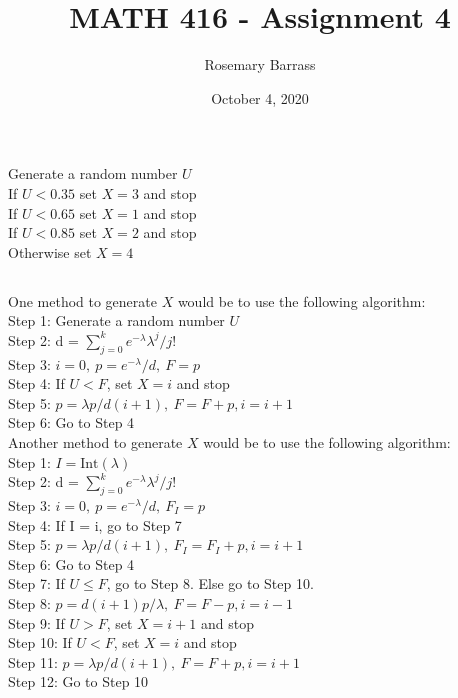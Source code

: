\documentclass{article}
\title{MATH 416 - Assignment 4}
\author{Rosemary Barrass }
\date{October 4, 2020}
\begin{document}
\setcounter{section}{4}
\setcounter{subsection}{2}
\subsection{}
Generate a random number $U$ \\
If $U < 0.35$ set $X=3$ and stop \\
If $U < 0.65$ set $X=1$ and stop \\
If $U < 0.85$ set $X=2$ and stop \\
Otherwise set $X=4$
\newpage

\setcounter{subsection}{12}
\subsection{}
One method to generate $X$ would be to use the following algorithm: \\
Step 1: Generate a random number $U$ \\
Step 2: d = $\sum_{j=0}^k e^{-\lambda}\lambda^j/j!$ \\
Step 3: $i=0,~p=e^{-\lambda}/d,~F=p$ \\
Step 4: If $U < F$, set $X=i$ and stop \\
Step 5: $p = \lambda p/d(i+1),~F = F+p, i = i+1$ \\
Step 6: Go to Step 4 \\

Another method to generate $X$ would be to use the following algorithm: \\
Step 1: $I=\text{Int}(\lambda)$ \\
Step 2: d = $\sum_{j=0}^k e^{-\lambda}\lambda^j/j!$ \\
Step 3: $i=0,~p=e^{-\lambda}/d,~F_I = p$ \\
Step 4: If I = i, go to Step 7\\
Step 5: $p = \lambda p/d(i+1),~F_I = F_I+p, i = i+1$ \\
Step 6: Go to Step 4 \\
Step 7: If $U \leq F$, go to Step 8. Else go to Step 10. \\
Step 8: $p = d(i+1)p/\lambda,~F = F-p, i = i-1$ \\
Step 9: If $U > F$, set $X = i+1$ and stop \\
Step 10: If $U < F$, set $X=i$ and stop \\
Step 11: $p = \lambda p/d(i+1),~F = F+p, i = i+1$ \\
Step 12: Go to Step 10 \\
\newpage
\end{document}
